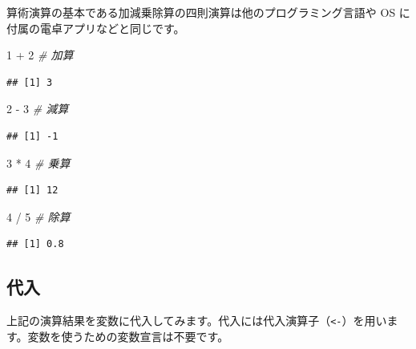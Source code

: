 \documentclass[
  12pt,
]{book}
\newenvironment{Shaded}{\begin{snugshade}}{\end{snugshade}}
\newcommand{\CommentTok}[1]{\textcolor[rgb]{0.56,0.35,0.01}{\textit{#1}}}
\newcommand{\DecValTok}[1]{\textcolor[rgb]{0.00,0.00,0.81}{#1}}
\newcommand{\SpecialCharTok}[1]{\textcolor[rgb]{0.00,0.00,0.00}{#1}}
\begin{document}
算術演算の基本である加減乗除算の四則演算は他のプログラミング言語や OS に付属の電卓アプリなどと同じです。

\begin{Shaded}
\begin{Highlighting}[]
\DecValTok{1} \SpecialCharTok{+} \DecValTok{2}     \CommentTok{\# 加算}
\end{Highlighting}
\end{Shaded}

\begin{verbatim}
## [1] 3
\end{verbatim}

\begin{Shaded}
\begin{Highlighting}[]
\DecValTok{2} \SpecialCharTok{{-}} \DecValTok{3}     \CommentTok{\# 減算}
\end{Highlighting}
\end{Shaded}

\begin{verbatim}
## [1] -1
\end{verbatim}

\begin{Shaded}
\begin{Highlighting}[]
\DecValTok{3} \SpecialCharTok{*} \DecValTok{4}     \CommentTok{\# 乗算}
\end{Highlighting}
\end{Shaded}

\begin{verbatim}
## [1] 12
\end{verbatim}

\begin{Shaded}
\begin{Highlighting}[]
\DecValTok{4} \SpecialCharTok{/} \DecValTok{5}     \CommentTok{\# 除算}
\end{Highlighting}
\end{Shaded}

\begin{verbatim}
## [1] 0.8
\end{verbatim}

\hypertarget{ux4ee3ux5165}{%
\subsection{代入}\label{ux4ee3ux5165}}

上記の演算結果を変数に代入してみます。代入には代入演算子（\texttt{\textless{}-}）を用います。変数を使うための変数宣言は不要です。
\end{document}
